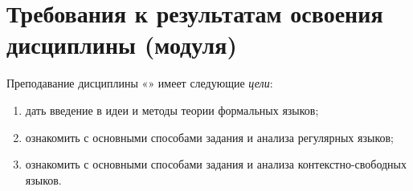 \documentclass{rpd}
\begin{document}
\maketitle

\section{Требования к результатам освоения дисциплины (модуля)}

    Преподавание дисциплины «\@discipline» имеет следующие \emph{цели}:
    \begin{enumerate}
        \item дать введение в идеи и методы теории формальных языков;
        \item ознакомить с основными способами задания и анализа регулярных языков;
        \item ознакомить с основными способами задания и анализа контекстно-свободных языков.
    \end{enumerate}
\end{document}
